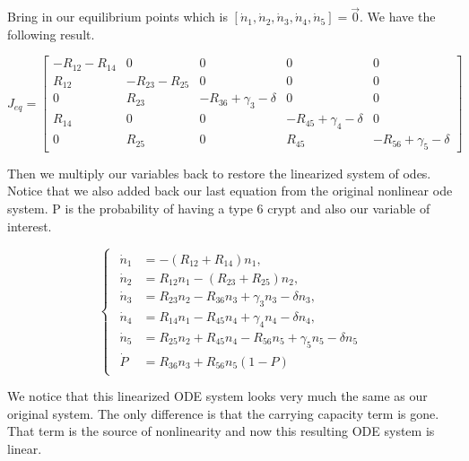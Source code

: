 Bring in our equilibrium points which is $[\dot{n}_1, \dot{n}_2, \dot{n}_3, \dot{n}_4, \dot{n}_5] = \Vec{0}$. We have the following result.

\begin{equation}
\renewcommand{\arraystretch}{1.5}
J_{eq} = \begin{bmatrix}
- R_{12} - R_{14} & 0 & 0 & 0 & 0 \\
R_{12} & - R_{23} - R_{25} & 0 & 0 & 0 \\
0 & R_{23} & -R_{36} + \gamma_3 - \delta & 0 & 0 \\
R_{14} & 0 & 0 & -R_{45} + \gamma_4 - \delta & 0 \\
0 & R_{25} & 0 & R_{45} & -R_{56} + \gamma_5 - \delta
\end{bmatrix}
\end{equation}

Then we multiply our variables back to restore the linearized system of odes. Notice that we also added back our last equation from the original nonlinear ode system. P is the probability of having a type 6 crypt and also our variable of interest. 

\begin{equation}
\begin{cases}
\begin{aligned}
    \dot{n}_1 &= -(R_{12} + R_{14})n_1, \\
    \dot{n}_2 &= R_{12}n_1 - (R_{23} + R_{25})n_2, \\
    \dot{n}_3 &= R_{23}n_2 - R_{36}n_3 + \gamma_3 n_3 - \delta n_3, \\
    \dot{n}_4 &= R_{14}n_1 - R_{45}n_4 + \gamma_4 n_4 - \delta n_4, \\
    \dot{n}_5 &= R_{25}n_2 + R_{45}n_4 - R_{56}n_5 + \gamma_5 n_5 - \delta n_5 \\
    \dot{P} &= R_{36} n_3 + R_{56}n_5 (1-P)
\end{aligned}
\end{cases}
\end{equation}

We notice that this linearized ODE system looks very much the same as our original system. The only difference is that the carrying capacity term is gone. That term is the source of nonlinearity and now this resulting ODE system is linear.
